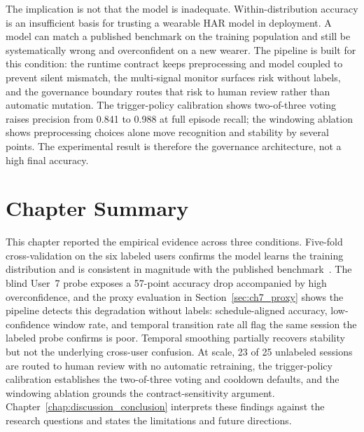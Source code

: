 The implication is not that the model is inadequate. Within-distribution accuracy is an insufficient basis for trusting a wearable HAR model in deployment. A model can match a published benchmark on the training population and still be systematically wrong and overconfident on a new wearer. The pipeline is built for this condition: the runtime contract keeps preprocessing and model coupled to prevent silent mismatch, the multi-signal monitor surfaces risk without labels, and the governance boundary routes that risk to human review rather than automatic mutation. The trigger-policy calibration shows two-of-three voting raises precision from 0.841 to 0.988 at full episode recall; the windowing ablation shows preprocessing choices alone move recognition and stability by several points. The experimental result is therefore the governance architecture, not a high final accuracy.

\section{Chapter Summary}
\label{sec:ch7_summary}

This chapter reported the empirical evidence across three conditions. Five-fold cross-validation on the six labeled users confirms the model learns the training distribution and is consistent in magnitude with the published benchmark~\cite{oleh2025recognition}. The blind User~7 probe exposes a 57-point accuracy drop accompanied by high overconfidence, and the proxy evaluation in Section~\ref{sec:ch7_proxy} shows the pipeline detects this degradation without labels: schedule-aligned accuracy, low-confidence window rate, and temporal transition rate all flag the same session the labeled probe confirms is poor. Temporal smoothing partially recovers stability but not the underlying cross-user confusion. At scale, 23 of 25 unlabeled sessions are routed to human review with no automatic retraining, the trigger-policy calibration establishes the two-of-three voting and cooldown defaults, and the windowing ablation grounds the contract-sensitivity argument. Chapter~\ref{chap:discussion_conclusion} interprets these findings against the research questions and states the limitations and future directions.
